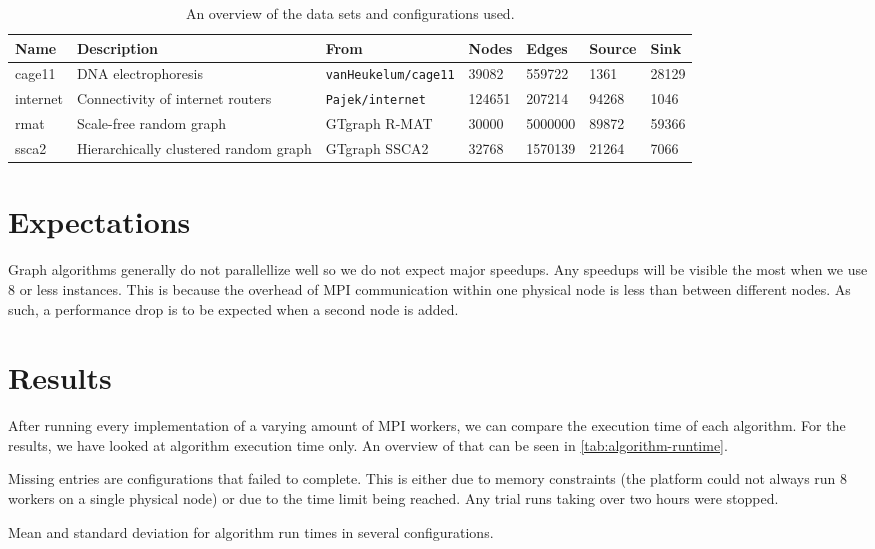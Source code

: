 \begin{table}
	\centering

	\begin{tabularx}{\textwidth}{l | X | l | l | l | l | l}
		Name & Description & From & Nodes & Edges & Source & Sink \\
		\hline
		cage11 & DNA electrophoresis & \texttt{vanHeukelum/cage11} & 39082 & 559722 & 1361 & 28129 \\
		internet & Connectivity of internet routers & \texttt{Pajek/internet} & 124651 & 207214 & 94268 & 1046 \\
		rmat & Scale-free random graph & GTgraph R-MAT & 30000 & 5000000 & 89872 & 59366 \\
		ssca2 & Hierarchically clustered random graph & GTgraph SSCA2 & 32768 & 1570139 & 21264 & 7066 \\
	\end{tabularx}
	\caption{An overview of the data sets and configurations used.}
	\label{tab:data-overview}
\end{table}


\section{Expectations}
Graph algorithms generally do not parallellize well %
so we do not expect major speedups. Any speedups will be visible the most when we use 8 or less instances. This is because the overhead of MPI communication within one physical node is less than between different nodes. As such, a performance drop is to be expected when a second node is added.

\section{Results}
After running every implementation of a varying amount of MPI workers, we can compare the execution time of each algorithm. For the results, we have looked at algorithm execution time only. An overview of that can be seen in \autoref{tab:algorithm-runtime}.

Missing entries are configurations that failed to complete. This is either due to memory constraints (the platform could not always run 8 workers on a single physical node) or due to the time limit being reached. Any trial runs taking over two hours were stopped.

\begin{table}
    \centering
    
    \caption{Mean and standard deviation for algorithm run times in several configurations.}
    \label{tab:algorithm-runtime}
\end{table}

